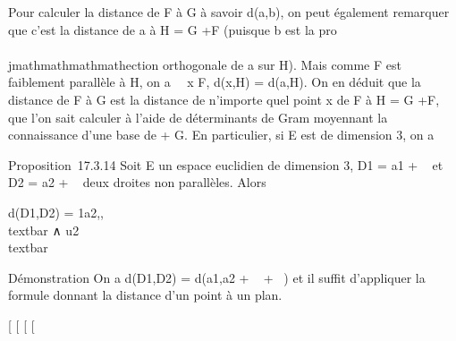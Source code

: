 Pour calculer la distance de F à G à savoir d(a,b), on peut également
remarquer que c'est la distance de a à H = G
+\overrightarrow F (puisque b est la pro\\\\jmathmathmathmathection
orthogonale de a sur H). Mais comme F est faiblement parallèle à H, on a
\forall~~x \in F, d(x,H) = d(a,H). On en déduit que la
distance de F à G est la distance de n'importe quel point x de F à H = G
+\overrightarrow F, que l'on sait calculer à l'aide
de déterminants de Gram moyennant la connaissance d'une base de
\overrightarrowF +\overrightarrow
G. En particulier, si E est de dimension 3, on a

Proposition~17.3.14 Soit E un espace euclidien de dimension 3,
D1 = a1 +
~ et D2 =
a2 + ~ deux
droites non parallèles. Alors

d(D1,D2) = \Big
\textbar{}{[}\overrightarrowa1a2,,\overrightarrowu2{]}\Big
\textbar{} \over
\\textbar{}
∧\overrightarrow
u2\\textbar{}

Démonstration On a d(D1,D2) =
d(a1,a2 +
~ +
~) et il suffit
d'appliquer la formule donnant la distance d'un point à un plan.

{[}
{[}
{[}
{[}
